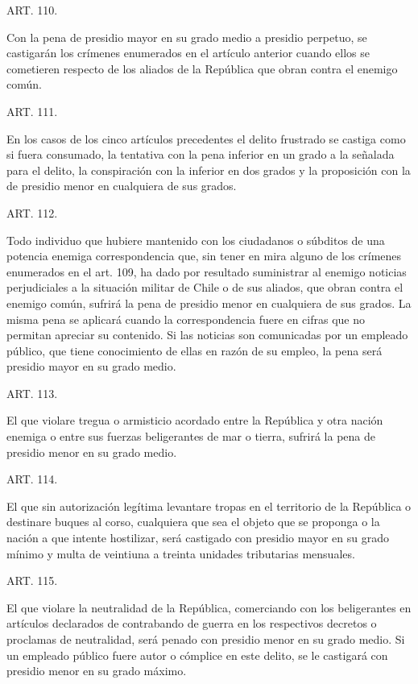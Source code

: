     ART. 110.

    Con la pena de presidio mayor en su grado medio a presidio perpetuo, se castigarán los crímenes enumerados en el artículo anterior cuando ellos se cometieren respecto de los aliados de la República que obran contra el enemigo común.



    ART. 111.

    En los casos de los cinco artículos precedentes el delito frustrado se castiga como si fuera consumado, la tentativa con la pena inferior en un grado a la señalada para el delito, la conspiración con la inferior en dos grados y la proposición con la de presidio menor en cualquiera de sus grados.


    ART. 112.

    Todo individuo que hubiere mantenido con los ciudadanos o súbditos de una potencia enemiga correspondencia que, sin tener en mira alguno de los crímenes enumerados en el art. 109, ha dado por resultado suministrar al enemigo noticias perjudiciales a la situación militar de Chile o de sus aliados, que obran contra el enemigo común, sufrirá la pena de presidio menor en cualquiera de sus grados.
    La misma pena se aplicará cuando la correspondencia fuere en cifras que no permitan apreciar su contenido.
    Si las noticias son comunicadas por un empleado público, que tiene conocimiento de ellas en razón de su empleo, la pena será presidio mayor en su grado medio.



    ART. 113.

    El que violare tregua o armisticio acordado entre la República y otra nación enemiga o entre sus fuerzas beligerantes de mar o tierra, sufrirá la pena de presidio menor en su grado medio.


    ART. 114.

    El que sin autorización legítima levantare tropas en el territorio de la República o destinare buques al corso, cualquiera que sea el objeto que se proponga o la nación a que intente hostilizar, será castigado con presidio mayor en su grado mínimo y multa de veintiuna a treinta unidades tributarias mensuales.






    ART. 115.

    El que violare la neutralidad de la República, comerciando con los beligerantes en artículos declarados de contrabando de guerra en los respectivos decretos o proclamas de neutralidad, será penado con presidio menor en su grado medio.
    Si un empleado público fuere autor o cómplice en este delito, se le castigará con presidio menor en su grado máximo.


